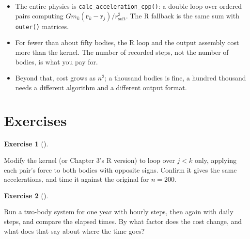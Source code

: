 \documentclass[
  10.5pt,
  letterpaper,
]{scrbook}
\providecommand{\tightlist}{%
  \setlength{\itemsep}{0pt}\setlength{\parskip}{0pt}}
\theoremstyle{definition}
\newtheorem{exercise}{Exercise}[chapter]
\theoremstyle{plain}
\theoremstyle{remark}
\begin{document}
\begin{tcolorbox}[enhanced jigsaw, arc=.35mm, bottomrule=.15mm, bottomtitle=1mm, breakable, colback=white, colbacktitle=quarto-callout-tip-color!10!white, colframe=quarto-callout-tip-color-frame, coltitle=black, left=2mm, leftrule=.75mm, opacityback=0, opacitybacktitle=0.6, rightrule=.15mm, title={Key results}, titlerule=0mm, toprule=.15mm, toptitle=1mm]

\begin{itemize}
\tightlist
\item
  The entire physics is \texttt{calc\_acceleration\_cpp()}: a double
  loop over ordered pairs computing
  \(Gm_k(\mathbf{r}_k - \mathbf{r}_j)/r_{\mathrm{soft}}^3\). The R
  fallback is the same sum with \texttt{outer()} matrices.
\item
  For fewer than about fifty bodies, the R loop and the output assembly
  cost more than the kernel. The number of recorded steps, not the
  number of bodies, is what you pay for.
\item
  Beyond that, cost grows as \(n^2\); a thousand bodies is fine, a
  hundred thousand needs a different algorithm and a different output
  format.
\end{itemize}

\end{tcolorbox}

\section*{Exercises}\label{exercises-14}


\begin{exercise}[]\protect\hypertarget{exr-ch15-halve}{}\label{exr-ch15-halve}

Modify the kernel (or Chapter 3's R version) to loop over \(j < k\)
only, applying each pair's force to both bodies with opposite signs.
Confirm it gives the same accelerations, and time it against the
original for \(n = 200\).

\end{exercise}

\begin{exercise}[]\protect\hypertarget{exr-ch15-record}{}\label{exr-ch15-record}

Run a two-body system for one year with hourly steps, then again with
daily steps, and compare the elapsed times. By what factor does the cost
change, and what does that say about where the time goes?

\end{exercise}
\end{document}
